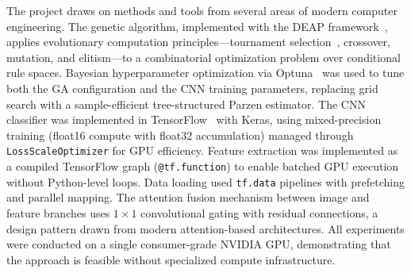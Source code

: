 \documentclass[runningheads]{llncs}
\begin{document}
The project draws on methods and tools from several areas of modern computer engineering. The genetic algorithm, implemented with the DEAP framework~\cite{fortin2012deap}, applies evolutionary computation principles---tournament selection~\cite{goldberg1991comparative}, crossover, mutation, and elitism---to a combinatorial optimization problem over conditional rule spaces. Bayesian hyperparameter optimization via Optuna~\cite{akiba2019optuna} was used to tune both the GA configuration and the CNN training parameters, replacing grid search with a sample-efficient tree-structured Parzen estimator. The CNN classifier was implemented in TensorFlow~\cite{tensorflow2015whitepaper} with Keras, using mixed-precision training (float16 compute with float32 accumulation) managed through \texttt{LossScaleOptimizer} for GPU efficiency. Feature extraction was implemented as a compiled TensorFlow graph (\texttt{@tf.function}) to enable batched GPU execution without Python-level loops. Data loading used \texttt{tf.data} pipelines with prefetching and parallel mapping. The attention fusion mechanism between image and feature branches uses $1 \times 1$ convolutional gating with residual connections, a design pattern drawn from modern attention-based architectures. All experiments were conducted on a single consumer-grade NVIDIA GPU, demonstrating that the approach is feasible without specialized compute infrastructure.

\end{document}
